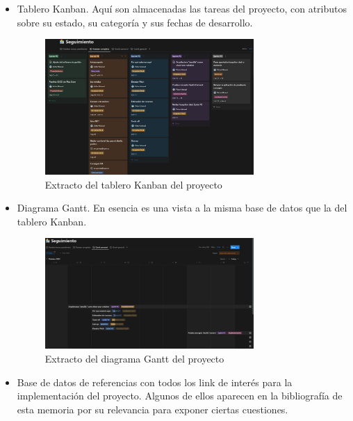             \begin{itemize}
                \item Tablero Kanban. Aquí son almacenadas las tareas del proyecto, con atributos sobre su estado, su categoría y sus fechas de desarrollo.
                    \begin{figure}[h!]
                        \centering
                        \includegraphics[width=0.75\textwidth]{figures/s0/Kanban completo.PNG}
                        \caption{Extracto del tablero Kanban del proyecto}
                        \label{fig:notion:kanban}
                    \end{figure}
                \item Diagrama Gantt. En esencia es una vista a la misma base de datos que la del tablero Kanban.
                    \begin{figure}[h!]
                        \centering
                        \includegraphics[width=0.75\textwidth]{figures/s0/gantt semanal.PNG}
                        \caption{Extracto del diagrama Gantt del proyecto}
                        \label{fig:notion:gantt}
                    \end{figure}
                \item Base de datos de referencias con todos los link de interés para la implementación del proyecto. Algunos de ellos aparecen en la bibliografía de esta memoria por su relevancia para exponer ciertas cuestiones.

\end{itemize}
